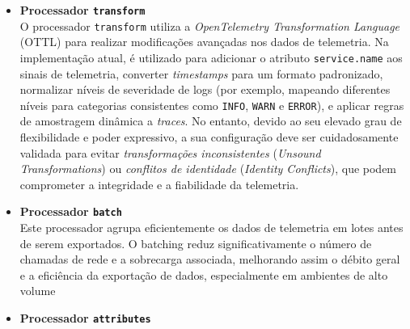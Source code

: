 \begin{itemize}

\item \textbf{Processador \texttt{transform}}\\

O processador \texttt{transform} utiliza a \textit{OpenTelemetry Transformation Language} (OTTL) para realizar modificações avançadas nos dados de telemetria. Na implementação atual, é utilizado para adicionar o atributo \texttt{service.name} aos sinais de telemetria, converter \textit{timestamps} para um formato padronizado, normalizar níveis de severidade de logs (por exemplo, mapeando diferentes níveis para categorias consistentes como \texttt{INFO}, \texttt{WARN} e \texttt{ERROR}), e aplicar regras de amostragem dinâmica a \textit{traces}. No entanto, devido ao seu elevado grau de flexibilidade e poder expressivo, a sua configuração deve ser cuidadosamente validada para evitar \textit{transformações inconsistentes} (\textit{Unsound Transformations}) ou \textit{conflitos de identidade} (\textit{Identity Conflicts}), que podem comprometer a integridade e a fiabilidade da telemetria.

\clearpage

\item \textbf{Processador \texttt{batch}}\\

Este processador agrupa eficientemente os dados de telemetria em lotes antes de serem exportados. O batching reduz significativamente o número de chamadas de rede e a sobrecarga associada, melhorando assim o débito geral e a eficiência da exportação de dados, especialmente em ambientes de alto volume

\item \textbf{Processador \texttt{attributes}}\\


\end{itemize}
